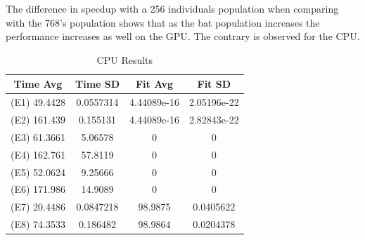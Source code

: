 \documentclass[conference]{IEEEtran}
\begin{document}
The difference in speedup with a 256 individuals population when
comparing with the 768's population shows that as the bat population
increases the performance increases as well on the GPU. The contrary is
observed for the CPU.





\begin{table}[H]
    \renewcommand{\arraystretch}{1.3}
    \caption{CPU Results}
    \label{results-cpu}
    \centering
    \begin{tabular}{c|c|c|c}
    \hline
        Time Avg & Time SD & Fit Avg & Fit SD\\
    \hline
        (E1) 49.4428 & 0.0557314 & 4.44089e-16 & 2.05196e-22 \\
        (E2) 161.439 & 0.155131 & 4.44089e-16 & 2.82843e-22 \\
        (E3) 61.3661 & 5.06578   & 0  & 0 \\
        (E4) 162.761 & 57.8119 & 0 & 0 \\
        (E5) 52.0624 & 9.25666   & 0  & 0 \\
        (E6) 171.986 & 14.9089 & 0 & 0 \\
        (E7) 20.4486 & 0.0847218 & 98.9875 & 0.0405622 \\
        (E8) 74.3533 & 0.186482 & 98.9864 & 0.0204378 \\
    \end{tabular}
\end{table}
\end{document}
